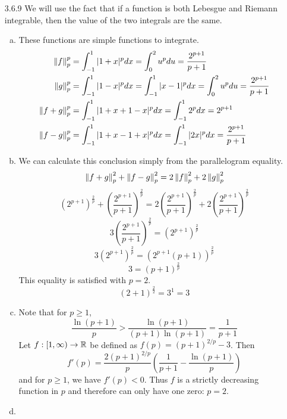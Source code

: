 \documentclass[../../Solutions.tex]{subfiles}
\begin{document}
\begin{itemize}
	\item [3.6.9] We will use the fact that if a function is both Lebesgue and Riemann integrable, then the value of the two integrals are the same.
	\begin{enumerate}[(a)]
		\item These functions are simple functions to integrate.
		\begin{equation*} \begin{split} 
			\left\lVert f\right\rVert_p^p & = \int_{-1}^{1} |1+x|^p dx = \int_0^2 u^p du = \frac{2^{p+1}}{p+1} \\
			\left\lVert g\right\rVert_p^p & = \int_{-1}^{1} |1-x|^p dx = \int_{-1}^1 |x-1|^p dx = \int_0^2 u^p du = \frac{2^{p+1}}{p+1} \\
			\left\lVert f+g\right\rVert_p^p & = \int_{-1}^1 |1+x+1-x|^p dx = \int_{-1}^1 2^p dx = 2^{p+1} \\
			\left\lVert f-g\right\rVert_p^p & = \int_{-1}^1 |1+x-1+x|^p dx = \int_{-1}^1 |2x|^p dx = \frac{2^{p+1}}{p+1}
		\end{split} \end{equation*}
		\item We can calculate this conclusion simply from the parallelogram equality.
			$$ \left\lVert f+g\right\rVert_p^2 + \left\lVert f-g\right\rVert_p^2 = 2\left\lVert f\right\rVert_p^2 + 2\left\lVert g\right\rVert_p^2 $$
			$$ \left(2^{p+1}\right)^{\frac{2}{p}} + \left(\frac{2^{p+1}}{p+1}\right)^{\frac{2}{p}} = 2\left(\frac{2^{p+1}}{p+1}\right)^{\frac{2}{p}} + 2\left(\frac{2^{p+1}}{p+1}\right)^{\frac{2}{p}} $$
			$$ 3\left(\frac{2^{p+1}}{p+1}\right)^{\frac{2}{p}} = \left(2^{p+1}\right)^{\frac{2}{p}} $$
			$$ 3\left(2^{p+1}\right)^{\frac{2}{p}} = \left(2^{p+1}(p+1)\right)^{\frac{2}{p}} $$
			$$ 3 = (p+1)^{\frac{2}{p}} $$
			This equality is satisfied with $p = 2$.
			$$ (2+1)^\frac{2}{2} = 3^1 = 3 $$
		\item Note that for $p \geq 1$,
			$$ \frac{\ln(p+1)}{p} > \frac{\ln(p+1)}{(p+1)\ln(p+1)} = \frac{1}{p+1} $$
			Let $f:[1,\infty)\to\mathbb{R}$ be defined as $f(p) = (p+1)^{2/p} - 3$.
			Then
			$$ f'(p) = \frac{2(p+1)^{2/p}}{p}\left(\frac{1}{p+1} - \frac{\ln(p+1)}{p}\right) $$
			and for $p \geq 1$, we have $f'(p) < 0$.
			Thus $f$ is a strictly decreasing function in $p$ and therefore can only have one zero: $p = 2$.
		\item %
	\end{enumerate}
	
\end{itemize}
\end{document}
